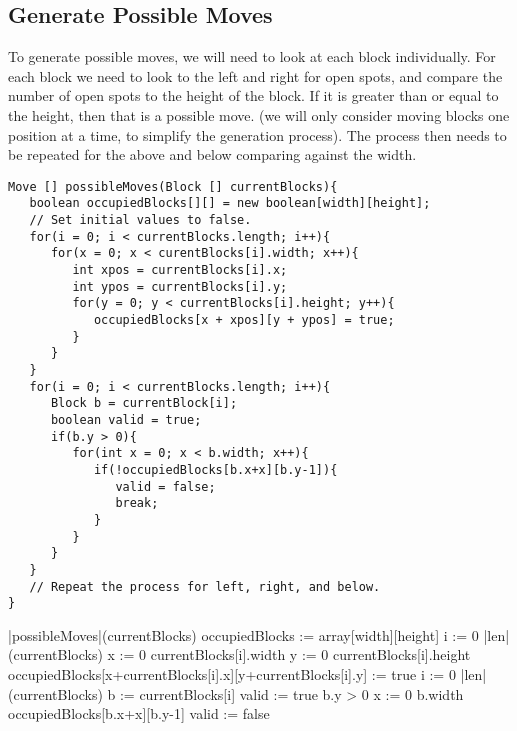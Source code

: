 \documentclass[a4paper]{article}
\begin{document}
\subsection{Generate Possible Moves}
To generate possible moves, we will need to look at each block individually. For each block we need to look to the left and right for open spots, and compare the number of open spots to the height of the block. If it is greater than or equal to the height, then that is a possible move. (we will only consider moving blocks one position at a time, to simplify the generation process). The process then needs to be repeated for the above and below comparing against the width. 
\begin{lstlisting}[caption=Generate Possible Moves]
Move [] possibleMoves(Block [] currentBlocks){
   boolean occupiedBlocks[][] = new boolean[width][height];
   // Set initial values to false.
   for(i = 0; i < currentBlocks.length; i++){
      for(x = 0; x < curentBlocks[i].width; x++){
         int xpos = currentBlocks[i].x;
         int ypos = currentBlocks[i].y;
         for(y = 0; y < currentBlocks[i].height; y++){
            occupiedBlocks[x + xpos][y + ypos] = true;
         }
      }
   }
   for(i = 0; i < currentBlocks.length; i++){
      Block b = currentBlock[i];
      boolean valid = true;
      if(b.y > 0){
         for(int x = 0; x < b.width; x++){
            if(!occupiedBlocks[b.x+x][b.y-1]){
               valid = false;
               break;
            }
         }
      }
   }
   // Repeat the process for left, right, and below. 
}
\end{lstlisting}
\begin{program}
\PROC |possibleMoves|(currentBlocks) \BODY
   occupiedBlocks := array[width][height]
   \FOR i := 0 \TO |len|(currentBlocks) \DO
      \FOR x := 0 \TO currentBlocks[i].width \DO
         \FOR y := 0 \TO currentBlocks[i].height \DO
            occupiedBlocks[x+currentBlocks[i].x][y+currentBlocks[i].y] := true
         \OD
      \OD
   \OD
   \FOR i := 0 \TO |len|(currentBlocks) \DO
      b := currentBlocks[i]
      valid := true 
      \IF b.y > 0 \THEN {}
         \FOR x := 0 \TO b.width \DO 
            \IF \NOT occupiedBlocks[b.x+x][b.y-1] \THEN 
               valid := false
               \EXIT
            \FI
         \OD
      \FI
   \OD\ENDPROC
\end{program}
\end{document}
